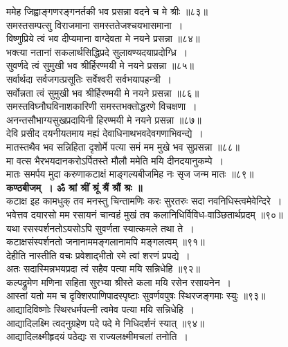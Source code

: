 \documentclass[twoside,top=1.7cm, bottom=1.7cm, outer=1cm,landscape, inner=1.5cm,a5paper,]{book}
\begin{document}
\begin{center}
ममेह जिह्वाङ्गणरङ्गनर्तकी भव प्रसन्ना वदने च मे श्रीः ॥८३॥\\[10pt]
समस्तसम्पत्सु विराजमाना समस्ततेजश्चयभासमाना~।\\
विष्णुप्रिये त्वं भव दीप्यमाना वाग्देवता मे नयने प्रसन्ना ॥८४॥\\[10pt]
भक्त्या नतानां सकलार्थसिद्धिप्रदे सुलावण्यदयाप्रदोग्ध्रि~।\\
सुवर्णदे त्वं सुमुखी भव श्रीर्हिरण्मयी मे नयने प्रसन्ना ॥८५॥\\[10pt]
सर्वार्थदा सर्वजगत्प्रसूतिः सर्वेश्वरी सर्वभयापहन्त्री~।\\
सर्वोन्नता त्वं सुमुखी भव श्रीर्हिरण्मयी मे नयने प्रसन्ना ॥८६॥\\[10pt]
समस्तविघ्नौघविनाशकारिणी समस्तभक्तोद्धरणे विचक्षणा~।\\
अनन्तसौभाग्यसुखप्रदायिनी हिरण्मयी मे नयने प्रसन्ना ॥८७॥\\[10pt]
देवि  प्रसीद दयनीयतमाय मह्यं देवाधिनाथभवदेवगणाभिवन्द्ये~।\\
मातस्तथैव भव सन्निहिता दृशोर्मे पत्या समं मम मुखे भव सुप्रसन्ना ॥८८॥\\
\newpage
मा वत्स भैरभयदानकरोऽर्पितस्ते मौलौ ममेति मयि दीनदयानुकम्पे~।\\
मातः समर्पय मुदा करुणाकटाक्षं माङ्गल्यबीजमिह नः सृज जन्म मातः ॥८९॥\\[10pt]
{\bfseries कण्ठबीजम्~। ॐ श्रां श्रीं श्रूं श्रैं श्रौं श्रः ॥}\\[10pt]
कटाक्ष इह कामधुक् तव मनस्तु चिन्तामणिः करः सुरतरुः सदा नवनिधिस्त्वमेवेन्दिरे~।\\
भवेत्तव दयारसो मम रसायनं चान्वहं मुखं तव कलानिधिर्विविध-वाञ्छितार्थप्रदम् ॥९०॥\\[10pt]
यथा रसस्पर्शनतोऽयसोऽपि सुवर्णता स्यात्कमले तथा ते~।\\
कटाक्षसंस्पर्शनतो जनानाममङ्गलानामपि मङ्गलत्वम् ॥९१॥\\[10pt]
देहीति नास्तीति वचः प्रवेशाद्भीतो रमे त्वां शरणं प्रपद्ये~।\\
अतः सदास्मिन्नभयप्रदा त्वं सहैव पत्या मयि सन्निधेहि ॥९२॥\\[10pt]
कल्पद्रुमेण मणिना सहिता सुरभ्या श्रीस्ते कला मयि रसेन रसायनेन~।\\
आस्तां यतो मम च दृक्शिरपाणिपादस्पृष्टाः सुवर्णवपुषः स्थिरजङ्गमाः स्युः ॥९३॥\\[10pt]
आद्यादिविष्णोः स्थिरधर्मपत्नी त्वमेव पत्या मयि सन्निधेहि~।\\
आद्यादिलक्ष्मि त्वदनुग्रहेण पदे पदे मे निधिदर्शनं स्यात् ॥९४॥\\[10pt]
आद्यादिलक्ष्मीहृदयं पठेद्यः स राज्यलक्ष्मीमचलां तनोति~।\\

\end{center}
\end{document}
